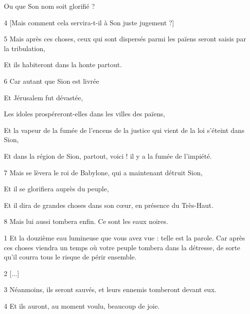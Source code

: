\par Ou que Son nom soit glorifié ?

\par 4 [Mais comment cela servira-t-il à Son juste jugement ?]

\par 5 Mais après ces choses, ceux qui sont dispersés parmi les païens seront saisis par la tribulation,

\par Et ils habiteront dans la honte partout.

\par 6 Car autant que Sion est livrée

\par Et Jérusalem fut dévastée,

\par Les idoles prospéreront-elles dans les villes des païens,

\par Et la vapeur de la fumée de l'encens de la justice qui vient de la loi s'éteint dans Sion,

\par Et dans la région de Sion, partout, voici ! il y a la fumée de l'impiété.

\par 7 Mais se lèvera le roi de Babylone, qui a maintenant détruit Sion,

\par Et il se glorifiera auprès du peuple,

\par Et il dira de grandes choses dans son cœur, en présence du Très-Haut.

\par 8 Mais lui aussi tombera enfin. Ce sont les eaux noires.


\par 1 Et la douzième eau lumineuse que vous avez vue : telle est la parole. Car après ces choses viendra un temps où votre peuple tombera dans la détresse, de sorte qu'il courra tous le risque de périr ensemble.

\par 2 [...]

\par 3 Néanmoins, ils seront sauvés, et leurs ennemis tomberont devant eux.

\par 4 Et ils auront, au moment voulu, beaucoup de joie.


